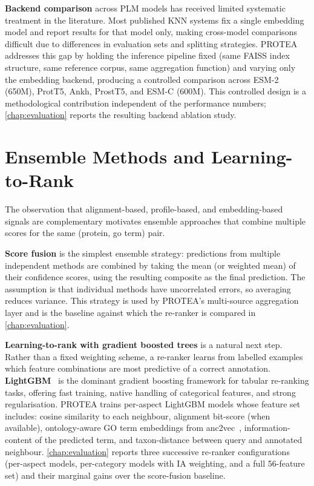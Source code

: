 \textbf{Backend comparison} across PLM models has received limited systematic
treatment in the literature. Most published KNN systems fix a single embedding
model and report results for that model only, making cross-model comparisons
difficult due to differences in evaluation sets and splitting strategies. PROTEA
addresses this gap by holding the inference pipeline fixed (same FAISS index
structure, same reference corpus, same aggregation function) and varying only the
embedding backend, producing a controlled comparison across ESM-2 (650M), ProtT5,
Ankh, ProstT5, and ESM-C (600M). This controlled design is a methodological
contribution independent of the performance numbers; \cref{chap:evaluation}
reports the resulting backend ablation study.

\section{Ensemble Methods and Learning-to-Rank}
\label{sec:related-ensembles}

The observation that alignment-based, profile-based, and embedding-based signals
are complementary motivates ensemble approaches that combine multiple scores for
the same (protein, \gls{go} term) pair.

\textbf{Score fusion} is the simplest ensemble strategy: predictions from
multiple independent methods are combined by taking the mean (or weighted mean)
of their confidence scores, using the resulting composite as the final
prediction. The assumption is that individual methods have uncorrelated errors,
so averaging reduces variance. This strategy is used by PROTEA's multi-source
aggregation layer and is the baseline against which the re-ranker is compared in
\cref{chap:evaluation}.

\textbf{Learning-to-rank with gradient boosted trees} is a natural next step.
Rather than a fixed weighting scheme, a re-ranker learns from labelled examples
which feature combinations are most predictive of a correct annotation.
\textbf{LightGBM}~\cite{ke2017lightgbm} is the dominant gradient boosting
framework for tabular re-ranking tasks, offering fast training, native handling of
categorical features, and strong regularisation. PROTEA trains per-aspect
LightGBM models whose feature set includes: cosine similarity to each neighbour,
alignment bit-score (when available), ontology-aware GO term embeddings from
anc2vec~\cite{edera2022anc2vec}, information-content of the predicted term,
and taxon-distance between query and annotated neighbour. \cref{chap:evaluation}
reports three successive re-ranker configurations (per-aspect models, per-category
models with IA weighting, and a full 56-feature set) and their marginal gains over
the score-fusion baseline.

